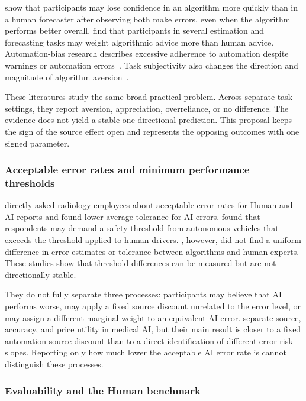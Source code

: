 \documentclass[11pt,a4paper]{article}
\begin{document}
\citet{dietvorst2015} show that participants may lose confidence in an algorithm more quickly than in a human forecaster after observing both make errors, even when the algorithm performs better overall. \citet{logg2019} find that participants in several estimation and forecasting tasks may weight algorithmic advice more than human advice. Automation-bias research describes excessive adherence to automation despite warnings or automation errors~\citep{goddard2012}. Task subjectivity also changes the direction and magnitude of algorithm aversion~\citep{castelo2019}.

These literatures study the same broad practical problem. Across separate task settings, they report aversion, appreciation, overreliance, or no difference. The evidence does not yield a stable one-directional prediction. This proposal keeps the sign of the source effect open and represents the opposing outcomes with one signed parameter.

\subsubsection{Acceptable error rates and minimum performance thresholds}

\citet{lenskjold2023} directly asked radiology employees about acceptable error rates for Human and AI reports and found lower average tolerance for AI errors. \citet{shariff2021} found that respondents may demand a safety threshold from autonomous vehicles that exceeds the threshold applied to human drivers. \citet{rebitschek2021}, however, did not find a uniform difference in error estimates or tolerance between algorithms and human experts. These studies show that threshold differences can be measured but are not directionally stable.

They do not fully separate three processes: participants may believe that AI performs worse, may apply a fixed source discount unrelated to the error level, or may assign a different marginal weight to an equivalent AI error. \citet{longoni2019} separate source, accuracy, and price utility in medical AI, but their main result is closer to a fixed automation-source discount than to a direct identification of different error-risk slopes. Reporting only how much lower the acceptable AI error rate is cannot distinguish these processes.

\subsubsection{Evaluability and the Human benchmark}
\end{document}
